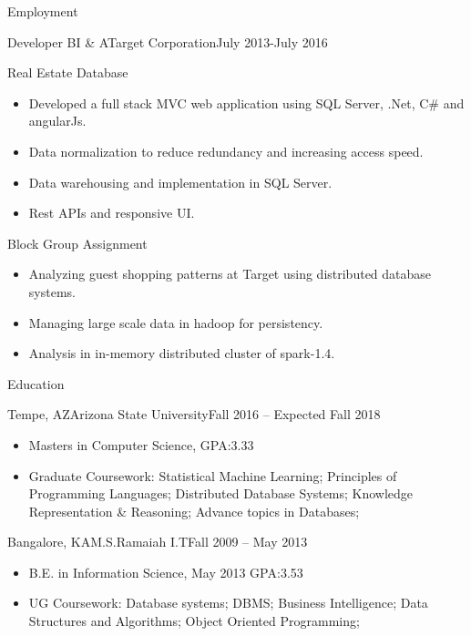 \documentclass[]{nakulcv}
\begin{document}
	\makeheader
	
	\begin{cvsection}{Employment}
		\begin{cvsubsection}{Developer BI \& A}{Target Corporation}{July 2013-July 2016}
		\begin{cvsubsection}{Real Estate Database}{}{}
				\begin{itemize}
					\item	Developed a full stack MVC web application using SQL Server, .Net, C\# and angularJs.
					\item Data normalization to reduce redundancy and increasing access speed.
					\item Data warehousing and implementation in SQL Server.
					\item Rest APIs and responsive UI.
				\end{itemize}
			\end{cvsubsection}
			\begin{cvsubsection}{Block Group Assignment}{}{}
				\begin{itemize}
					\item Analyzing guest shopping patterns at Target using distributed database systems.
					\item Managing large scale data in hadoop for persistency.
					\item Analysis in in-memory distributed cluster of spark-1.4.
				\end{itemize}
			\end{cvsubsection}
		\begin{cvsection}{Education}
		\begin{cvsubsection}{Tempe, AZ}{Arizona State University}{Fall 2016 -- Expected Fall 2018}
			\begin{itemize}
				\item Masters in Computer Science, GPA:3.33
				\item Graduate Coursework: Statistical Machine Learning; Principles of Programming Languages; Distributed Database Systems; Knowledge Representation \& Reasoning; Advance topics in Databases;
			\end{itemize}
		\end{cvsubsection}
		\begin{cvsubsection}{Bangalore, KA}{M.S.Ramaiah I.T}{Fall 2009 -- May 2013}
			\begin{itemize}
				\item B.E. in Information Science, May 2013 GPA:3.53
				\item UG Coursework: Database systems; DBMS; Business Intelligence; Data Structures and Algorithms; Object Oriented Programming;

\end{itemize}
\end{cvsubsection}
\end{cvsection}
\end{cvsubsection}
\end{cvsection}
\end{document}
